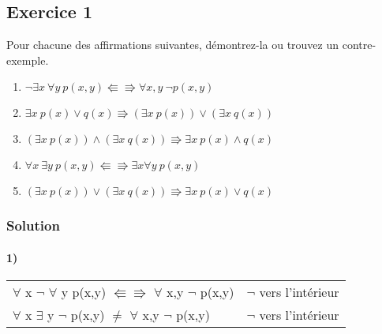 \section{}

\subsection*{Exercice 1}
Pour chacune des affirmations suivantes, démontrez-la ou trouvez un contre-exemple.
\begin{enumerate}
	\item $\neg \exists x \ \forall y \ p(x, y) \Lleftarrow\!\!\!\!\Rrightarrow \forall x, y \ \neg p(x, y)$
	\item $\exists x \ p(x) \vee q(x) \Rrightarrow (\exists x \ p(x)) \vee (\exists x \ q(x))$
	\item $(\exists x \ p(x)) \wedge (\exists x \ q(x)) \Rrightarrow \exists x \ p(x) \wedge q(x)$
	\item $\forall x \ \exists y \ p(x, y) \Lleftarrow\!\!\!\!\Rrightarrow \exists x \forall y \ p(x, y)$
	\item $(\exists x \ p(x)) \vee (\exists x \ q(x)) \Rrightarrow \exists x \ p(x) \vee q(x)$
\end{enumerate}

    \subsubsection*{Solution}
  
    \paragraph{1)}  
        \begin{tabular}{|l|l|}
        \hline
        $\forall$ x $\neg$ $\forall$ y p(x,y) $\Lleftarrow \Rrightarrow$ $\forall$ x,y $\neg$ p(x,y) & $\neg$ vers l'intérieur\\
        $\forall$ x $\exists$ y $\neg$ p(x,y) $\ne$ $\forall$ x,y $\neg$ p(x,y)& $\neg$ vers l'intérieur\\
        \hline
        \end{tabular}
    
